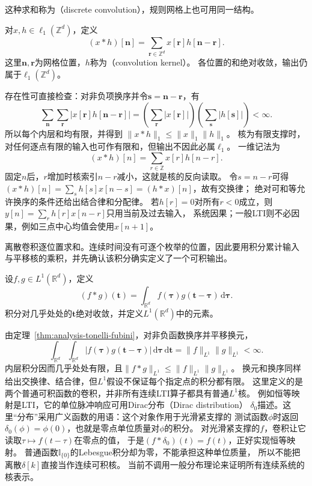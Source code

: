 这种求和称为（discrete convolution），规则网格上也可用同一结构。
\begin{definition}[网格上的离散卷积]
  \label{def:signal-analysis-discrete-convolution}
  对$x,h\in\ell_1(\mathbb Z^d)$，定义
  \begin{equation}
    (x*h)[\bm n]=\sum_{\bm r\in\mathbb Z^d}x[\bm r]h[\bm n-\bm r].
    \label{eq:signal-analysis-discrete-multidimensional-convolution}
  \end{equation}
  这里$\bm n,\bm r$为网格位置，$h$称为（convolution kernel）。
  各位置的和绝对收敛，输出仍属于$\ell_1(\mathbb Z^d)$。
\end{definition}
存在性可直接检查：对非负项换序并令$\bm s=\bm n-\bm r$，有
\[
  \sum_{\bm n}\sum_{\bm r}|x[\bm r]h[\bm n-\bm r]|
  =\left(\sum_{\bm r}|x[\bm r]|\right)
   \left(\sum_{\bm s}|h[\bm s]|\right)<\infty.
\]
所以每个内层和均有限，并得到
$\|x*h\|_1\leq\|x\|_1\|h\|_1$。
核为有限支撑时，对任何逐点有限的输入也可作有限和，但输出不因此必属$\ell_1$。
一维记法为
\begin{equation}
  (x*h)[n]=\sum_{r\in\mathbb Z}x[r]h[n-r].
  \label{eq:signal-analysis-linear-convolution}
\end{equation}
固定$n$后，$r$增加时核索引$n-r$减小，这就是核的反向读取。
令$s=n-r$可得$(x*h)[n]=\sum_s h[s]x[n-s]=(h*x)[n]$，故有交换律；
绝对可和等允许换序的条件还给出结合律和分配律。
若$h[r]=0$对所有$r<0$成立，则$y[n]=\sum_r h[r]x[n-r]$只用当前及过去输入，
系统因果；一般LTI则不必因果，例如三点中心均值会使用$x[n+1]$。

离散卷积逐位置求和。连续时间没有可逐个枚举的位置，因此要用积分累计输入
与平移核的乘积，并先确认该积分确实定义了一个可积输出。
\begin{definition}[连续卷积]
  \label{def:signal-analysis-continuous-convolution}
  设$f,g\in L^1(\mathbb R^d)$，定义
  \begin{equation}
    (f*g)(\bm t)=\int_{\mathbb R^d}f(\bm\tau)g(\bm t-\bm\tau)\,\mathrm d\bm\tau.
    \label{eq:signal-analysis-continuous-convolution}
  \end{equation}
  积分对几乎处处的$\bm t$绝对收敛，并定义$L^1(\mathbb R^d)$中的元素。
\end{definition}
由定理~\ref{thm:analysis-tonelli-fubini}，对非负函数换序并平移换元，
\[
  \int_{\mathbb R^d}\int_{\mathbb R^d}
  |f(\bm\tau)g(\bm t-\bm\tau)|\,\mathrm d\bm\tau\,\mathrm d\bm t
  =\|f\|_{L^1}\|g\|_{L^1}<\infty.
\]
内层积分因而几乎处处有限，且$\|f*g\|_{L^1}\leq\|f\|_{L^1}\|g\|_{L^1}$。
换元和换序同样给出交换律、结合律，但$L^1$假设不保证每个指定点的积分都有限。
这里定义的是两个普通可积函数的卷积，并非所有连续LTI算子都具有普通$L^1$核。
例如恒等映射是LTI，它的单位脉冲响应可用Dirac分布（Dirac distribution）
$\delta_0$描述。这里“分布”采用广义函数的用语：这个对象作用于光滑紧支撑的
测试函数$\phi$时返回$\delta_0(\phi)=\phi(0)$，也就是零点单位质量对$\phi$的积分。
对光滑紧支撑的$f$，卷积让它读取$\tau\mapsto f(t-\tau)$在零点的值，
于是$(f*\delta_0)(t)=f(t)$，正好实现恒等映射。
普通函数$\mathbb I_{\{0\}}$的Lebesgue积分却为零，不能承担这种单位质量，
所以不能把离散$\delta[k]$直接当作连续可积核。
当前不调用一般分布理论来证明所有连续系统的核表示。

